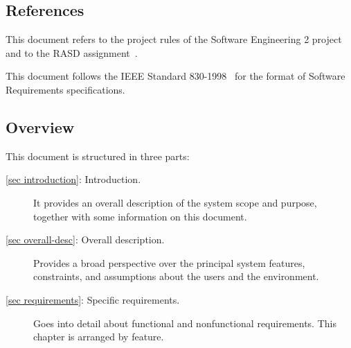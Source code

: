 \subsection{References}
This document refers to the project rules of the Software Engineering 2 project~\cite{se-project-rules} and to the RASD assignment~\cite{se-assignment}.

This document follows the IEEE Standard 830-1998~\cite{ieee-830-1198} for the format of Software Requirements specifications.
\subsection{Overview}
This document is structured in three parts:
\begin{description}
	\item[\autoref{sec introduction}: Introduction.] It provides an overall description of the system scope and purpose, together with some information on this document.
	\item[\autoref{sec overall-desc}: Overall description.] Provides a broad perspective over the principal system features, constraints, and assumptions about the users and the environment.
	\item[\autoref{sec requirements}: Specific requirements.] Goes into detail about functional and nonfunctional requirements. This chapter is arranged by feature.
\end{description}

